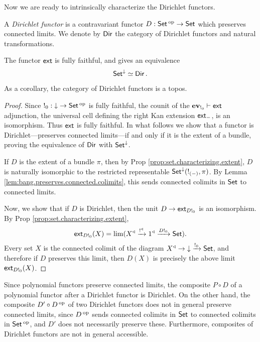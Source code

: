 Now we are ready to intrinsically characterize the Dirichlet functors.
\begin{defn}
A \emph{Dirichlet functor} is a contravariant functor $D : \operatorname{\mathsf{{Set}}}\operatorname{^\textnormal{op}} \to \operatorname{\mathsf{{Set}}}$
which preserves connected limits. We denote by $\operatorname{\mathsf{{Dir}}}$ the category of Dirichlet functors and natural transformations.
\end{defn}


\begin{thm}\label{thm:dirichlet.set.characterization}
  The functor $\operatorname{\mathsf{{ext}}}$ is fully faithful, and gives an equivalence
  $$\operatorname{\mathsf{{Set}}}^{\mathbin{\downarrow}} \simeq \operatorname{\mathsf{{Dir}}}.$$

  As a corollary, the category of Dirichlet functors is a topos.
\end{thm}
\begin{proof}
Since $!_0 : \mathbin{\downarrow} \to \operatorname{\mathsf{{Set}}}\operatorname{^\textnormal{op}}$ is fully faithful, the counit of the
$\operatorname{\textbf{ev}}_{!_0} \vdash \operatorname{\mathsf{{ext}}}$ adjunction, the universal cell defining the
right Kan extension $\operatorname{\mathsf{{ext}}}_-$, is an isomorphism. Thus $\operatorname{\mathsf{{ext}}}$ is fully faithful. In what follows we show that a functor is Dirichlet---preserves connected limits---if and only if it is the extent of a bundle, proving the equivalence of $\operatorname{\mathsf{{Dir}}}$ with $\operatorname{\mathsf{{Set}}}^{\mathbin{\downarrow}}$.

If $D$ is
the extent of a bundle $\pi$, then by Prop \ref{prop:set.characterizing.extent}, $D$ is naturally
isomorphic to the restricted representable $\operatorname{\mathsf{{Set}}}^{\mathbin{\downarrow}}(!_{(-)},\pi)$. By Lemma
\ref{lem:bang.preserves.connected.colimits}, this sends connected colimits in $\operatorname{\mathsf{{Set}}}$ to
connected limits.

Now, we show that if $D$ is Dirichlet, then the unit
$D \to \operatorname{\mathsf{{ext}}}_{D!_0}$ is an isomorphism. By Prop
\ref{prop:set.characterizing.extent}, 
  $$\operatorname{\mathsf{{ext}}}_{D!_0}(X) = \lim(X^{\triangleleft} \xrightarrow{!^{\triangleleft}} 1^{\triangleleft}
  \xrightarrow{D!_0} \operatorname{\mathsf{{Set}}}).$$
  Every set $X$ is the connected colimit of the diagram $X^{\triangleleft} \to
\mathbin{\downarrow} \xrightarrow{!_0} \operatorname{\mathsf{{Set}}}$, and therefore if $D$ preserves this limit, then
$D(X)$ is precisely the above limit $\operatorname{\mathsf{{ext}}}_{D!_0}(X)$.
\end{proof}

\begin{rmk}
 Since polynomial functors preserve connected limits, the composite $P \circ D$
 of a polynomial functor after a Dirichlet functor is Dirichlet. On the other
 hand, the composite $D' \circ D\operatorname{^\textnormal{op}}$ of two Dirichlet functors does not in
 general preserve connected limits, since $D\operatorname{^\textnormal{op}}$ sends connected colimits in
 $\operatorname{\mathsf{{Set}}}$ to connected colimits in $\operatorname{\mathsf{{Set}}}\operatorname{^\textnormal{op}}$, and $D'$ does not necessarily
 preserve these. Furthermore, composites of Dirichlet functors are not in
 general accessible.   
\end{rmk}


